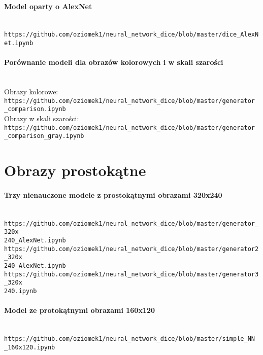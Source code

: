 \paragraph{Model oparty o AlexNet} \mbox{}\\
\texttt{https://github.com/oziomek1/neural\_network\_dice/blob/master/dice\_AlexNet.ipynb}

\paragraph{Porównanie modeli dla obrazów kolorowych i w skali szarości} \mbox{}\\
Obrazy kolorowe:\\
\texttt{https://github.com/oziomek1/neural\_network\_dice/blob/master/generator\\\_comparison.ipynb}
\\Obrazy w skali szarości:\\
\texttt{https://github.com/oziomek1/neural\_network\_dice/blob/master/generator\\\_comparison\_gray.ipynb}

\section{Obrazy prostokątne}
\paragraph{Trzy nienauczone modele z prostokątnymi obrazami 320x240} \mbox{}\\
\texttt{https://github.com/oziomek1/neural\_network\_dice/blob/master/generator\_320x\\240\_AlexNet.ipynb}\\
\texttt{https://github.com/oziomek1/neural\_network\_dice/blob/master/generator2\_320x\\240\_AlexNet.ipynb}\\
\texttt{https://github.com/oziomek1/neural\_network\_dice/blob/master/generator3\_320x\\240.ipynb}

\paragraph{Model ze protokątnymi obrazami 160x120} \mbox{}\\
\texttt{https://github.com/oziomek1/neural\_network\_dice/blob/master/simple\_NN\\\_160x120.ipynb}

